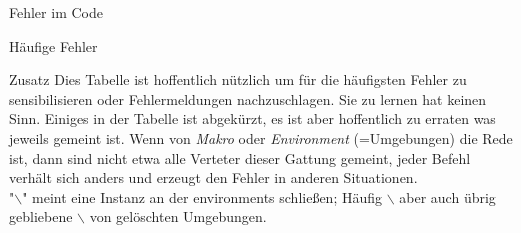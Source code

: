 \begin{frame}{Fehler im Code}
\begin{block}{Häufige Fehler}
    \begin{block}{Zusatz}
      Dies Tabelle ist hoffentlich nützlich um für die häufigsten Fehler zu sensibilisieren oder Fehlermeldungen nachzuschlagen.
      Sie zu lernen hat keinen Sinn. Einiges in der Tabelle ist abgekürzt, es ist aber hoffentlich zu erraten was jeweils gemeint ist.
      Wenn von \textit{Makro} oder \textit{Environment} (=Umgebungen) die Rede ist, dann sind nicht etwa alle Verteter dieser Gattung gemeint,
      jeder Befehl verhält sich anders und erzeugt den Fehler in anderen Situationen.\\
      "\texttt{$\backslash$\color{lstg}{end}}" meint eine Instanz an der environments schließen; Häufig \texttt{$\backslash$\color{lstg}{end}} aber auch übrig gebliebene
      \texttt{$\backslash$\color{lstg}{end}}\color{black} von gelöschten Umgebungen.
    \end{block}
    
  \end{block}
\end{frame}

